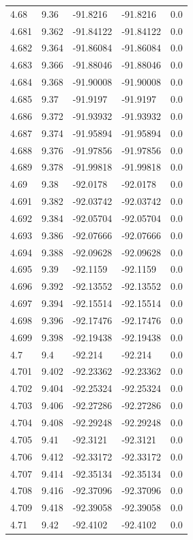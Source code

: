 \begin{tabular}{lllll}
4.68 & 9.36 & -91.8216 & -91.8216 & 0.0 \\
4.681 & 9.362 & -91.84122 & -91.84122 & 0.0 \\
4.682 & 9.364 & -91.86084 & -91.86084 & 0.0 \\
4.683 & 9.366 & -91.88046 & -91.88046 & 0.0 \\
4.684 & 9.368 & -91.90008 & -91.90008 & 0.0 \\
4.685 & 9.37 & -91.9197 & -91.9197 & 0.0 \\
4.686 & 9.372 & -91.93932 & -91.93932 & 0.0 \\
4.687 & 9.374 & -91.95894 & -91.95894 & 0.0 \\
4.688 & 9.376 & -91.97856 & -91.97856 & 0.0 \\
4.689 & 9.378 & -91.99818 & -91.99818 & 0.0 \\
4.69 & 9.38 & -92.0178 & -92.0178 & 0.0 \\
4.691 & 9.382 & -92.03742 & -92.03742 & 0.0 \\
4.692 & 9.384 & -92.05704 & -92.05704 & 0.0 \\
4.693 & 9.386 & -92.07666 & -92.07666 & 0.0 \\
4.694 & 9.388 & -92.09628 & -92.09628 & 0.0 \\
4.695 & 9.39 & -92.1159 & -92.1159 & 0.0 \\
4.696 & 9.392 & -92.13552 & -92.13552 & 0.0 \\
4.697 & 9.394 & -92.15514 & -92.15514 & 0.0 \\
4.698 & 9.396 & -92.17476 & -92.17476 & 0.0 \\
4.699 & 9.398 & -92.19438 & -92.19438 & 0.0 \\
4.7 & 9.4 & -92.214 & -92.214 & 0.0 \\
4.701 & 9.402 & -92.23362 & -92.23362 & 0.0 \\
4.702 & 9.404 & -92.25324 & -92.25324 & 0.0 \\
4.703 & 9.406 & -92.27286 & -92.27286 & 0.0 \\
4.704 & 9.408 & -92.29248 & -92.29248 & 0.0 \\
4.705 & 9.41 & -92.3121 & -92.3121 & 0.0 \\
4.706 & 9.412 & -92.33172 & -92.33172 & 0.0 \\
4.707 & 9.414 & -92.35134 & -92.35134 & 0.0 \\
4.708 & 9.416 & -92.37096 & -92.37096 & 0.0 \\
4.709 & 9.418 & -92.39058 & -92.39058 & 0.0 \\
4.71 & 9.42 & -92.4102 & -92.4102 & 0.0 \\

\end{tabular}
